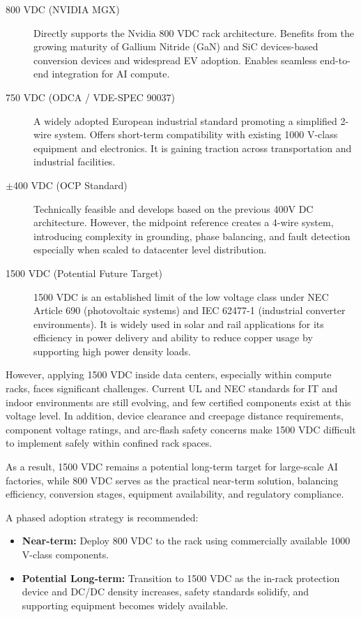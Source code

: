 \begin{description}
\item[800 VDC (NVIDIA MGX)] Directly supports the Nvidia 800 VDC rack architecture. Benefits from the growing maturity of Gallium Nitride (GaN) and SiC devices-based conversion devices and widespread EV adoption. Enables seamless end-to-end integration for AI compute.

\item[750 VDC (ODCA / VDE-SPEC 90037)] A widely adopted European industrial standard promoting a simplified 2-wire system. Offers short-term compatibility with existing 1000 V-class equipment and electronics. It is gaining traction across transportation and industrial facilities.

\item[$\pm$400 VDC (OCP Standard)] Technically feasible and develops based on the previous 400V DC architecture. However, the midpoint reference creates a 4-wire system, introducing complexity in grounding, phase balancing, and fault detection especially when scaled to datacenter level distribution.

\item[1500 VDC (Potential Future Target)] 1500 VDC is an established limit of the low voltage class under NEC Article 690 (photovoltaic systems) and IEC 62477-1 (industrial converter environments). It is widely used in solar and rail applications for its efficiency in power delivery and ability to reduce copper usage by supporting high power density loads.
\end{description}

However, applying 1500 VDC inside data centers, especially within compute racks, faces significant challenges. Current UL and NEC standards for IT and indoor environments are still evolving, and few certified components exist at this voltage level. In addition, device clearance and creepage distance requirements, component voltage ratings, and arc-flash safety concerns make 1500 VDC difficult to implement safely within confined rack spaces.

As a result, 1500 VDC remains a potential long-term target for large-scale AI factories, while 800 VDC serves as the practical near-term solution, balancing efficiency, conversion stages, equipment availability, and regulatory compliance.

A phased adoption strategy is recommended:
\begin{itemize}
\item \textbf{Near-term:} Deploy 800 VDC to the rack using commercially available 1000 V-class components.
\item \textbf{Potential Long-term:} Transition to 1500 VDC as the in-rack protection device and DC/DC density increases, safety standards solidify, and supporting equipment becomes widely available.
\end{itemize}
